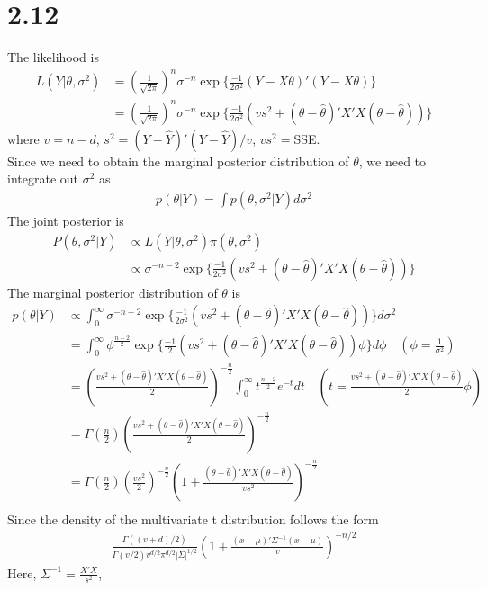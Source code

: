 \documentclass[11pt]{article}
\begin{document}
    \hypertarget{section}{%
\section{2.12}\label{section}}

    The likelihood is \[\begin{align}
    L(Y|\theta,\sigma^2)&=(\frac{1}{\sqrt{2\pi}})^n\sigma^{-n}\exp\{\frac{-1}{2\sigma^2}(Y-X\theta)'(Y-X\theta)\} \\
    &= (\frac{1}{\sqrt{2\pi}})^n\sigma^{-n}\exp\{\frac{-1}{2\sigma^2}(vs^2+(\theta-\hat{\theta})'X'X(\theta-\hat{\theta}))\}
\end{align}\] where \(v=n-d\), \(s^2=(Y-\hat{Y})'(Y-\hat{Y})/v\),
\(vs^2=\)SSE.\\
Since we need to obtain the marginal posterior distribution of
\(\theta\), we need to integrate out \(\sigma^2\) as \[\begin{align}
    p(\theta|Y)=\int p(\theta,\sigma^2|Y)d\sigma^2
\end{align}\] The joint posterior is \[\begin{align}
    P(\theta,\sigma^2|Y)&\propto L(Y|\theta,\sigma^2)\pi(\theta,\sigma^2) \\
    &\propto \sigma^{-n-2}\exp\{\frac{-1}{2\sigma^2}(vs^2+(\theta-\hat{\theta})'X'X(\theta-\hat{\theta}))\}
\end{align}\] The marginal posterior distribution of \(\theta\) is
\[\begin{align}
    p(\theta|Y)&\propto \int_0^{\infty}  \sigma^{-n-2}\exp\{\frac{-1}{2\sigma^2}(vs^2+(\theta-\hat{\theta})'X'X(\theta-\hat{\theta}))\} d\sigma^2 \\
    &= \int_0^\infty \phi^{\frac{n-2}{2}}\exp\{\frac{-1}{2}(vs^2+(\theta-\hat{\theta})'X'X(\theta-\hat{\theta}))\phi\} d\phi \quad (\phi=\frac{1}{\sigma^2}) \\
    &= (\frac{vs^2+(\theta-\hat{\theta})'X'X(\theta-\hat{\theta})}{2})^{-\frac{n}{2}}\int_0^\infty t^{\frac{n-2}{2}}e^{-t}dt \quad (t=\frac{vs^2+(\theta-\hat{\theta})'X'X(\theta-\hat{\theta})}{2}\phi) \\
    &= \Gamma(\frac{n}{2})(\frac{vs^2+(\theta-\hat{\theta})'X'X(\theta-\hat{\theta})}{2})^{-\frac{n}{2}} \\
    &= \Gamma(\frac{n}{2})(\frac{vs^2}{2})^{-\frac{n}{2}}(1+\frac{(\theta-\hat{\theta})'X'X(\theta-\hat{\theta})}{vs^2})^{-\frac{n}{2}} \\
\end{align}\] Since the density of the multivariate t distribution
follows the form \[\begin{align}
    \frac{\Gamma((v+d)/2)}{\Gamma(v/2)v^{d/2}\pi^{d/2}|\Sigma|^{1/2}}(1+\frac{(x-\mu)'\Sigma^{-1}(x-\mu)}{v})^{-n/2}
\end{align}\] Here, \(\Sigma^{-1}=\frac{X'X}{s^2}\),
\end{document}
